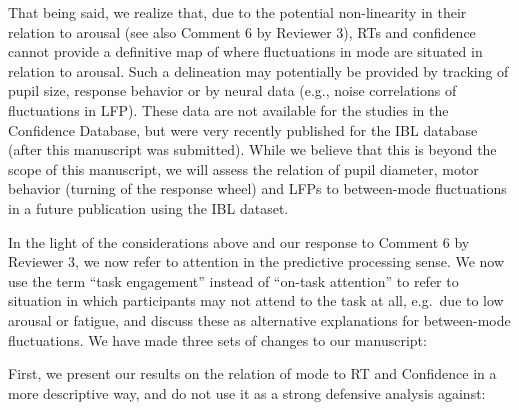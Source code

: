 \documentclass[
]{article}
\begin{document}
That being said, we realize that, due to the potential non-linearity in
their relation to arousal (see also Comment 6 by Reviewer 3), RTs and
confidence cannot provide a definitive map of where fluctuations in mode
are situated in relation to arousal. Such a delineation may potentially
be provided by tracking of pupil size, response behavior or by neural
data (e.g., noise correlations of fluctuations in LFP). These data are
not available for the studies in the Confidence Database, but were very
recently published for the IBL database (after this manuscript was
submitted). While we believe that this is beyond the scope of this
manuscript, we will assess the relation of pupil diameter, motor
behavior (turning of the response wheel) and LFPs to between-mode
fluctuations in a future publication using the IBL dataset.

In the light of the considerations above and our response to Comment 6
by Reviewer 3, we now refer to attention in the predictive processing
sense. We now use the term ``task engagement'' instead of ``on-task
attention'' to refer to situation in which participants may not attend
to the task at all, e.g.~due to low arousal or fatigue, and discuss
these as alternative explanations for between-mode fluctuations. We have
made three sets of changes to our manuscript:

First, we present our results on the relation of mode to RT and
Confidence in a more descriptive way, and do not use it as a strong
defensive analysis against:
\end{document}
